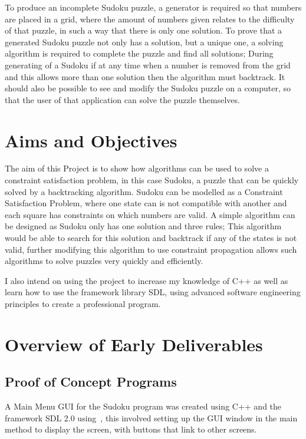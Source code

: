 \documentclass[]{final_report}
\begin{document}
To produce an incomplete Sudoku puzzle, a generator is required so that numbers are placed in a grid, where the amount of numbers given relates to the difficulty of that puzzle, in such a way that there is only one solution. To prove that a generated Sudoku puzzle not only has a solution, but a unique one, a solving algorithm is required to complete the puzzle and find all solutions; During generating of a Sudoku if at any time when a number is removed from the grid and this allows more than one solution then the algorithm must backtrack. It should also be possible to see and modify the Sudoku puzzle on a computer, so that the user of that application can solve the puzzle themselves.

\section*{Aims and Objectives}
The aim of this Project is to show how algorithms can be used to solve a constraint satisfaction problem, in this case Sudoku, a puzzle that can be quickly solved by a backtracking algorithm. Sudoku can be modelled as a Constraint Satisfaction Problem, where one state can is not compatible with another and each square has constraints on which numbers are valid. A simple algorithm can be designed as Sudoku only has one solution and three rules; This algorithm would be able to search for this solution and backtrack if any of the states is not valid, further modifying this algorithm to use constraint propagation allows such algorithms to solve puzzles very quickly and efficiently.

I also intend on using the project to increase my knowledge of C++ as well as learn how to use the framework library SDL, using advanced software engineering principles to create a professional program.

\newpage
\section*{Overview of Early Deliverables}

\subsection*{Proof of Concept Programs}

A Main Menu GUI for the Sudoku program was created using C++ and the framework SDL 2.0 using~\cite{MITCHELL:2013}, this involved setting up the GUI window in the main method to display the screen, with buttons that link to other screens.
\end{document}
